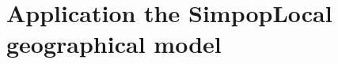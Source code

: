 \documentclass[10pt,a4paper]{article}
\theoremstyle{definition}
\theoremstyle{remark}
\begin{document}
%
%
%
%
%
%
%

\section{Application the SimpopLocal geographical model}
\label{application}
\end{document}
